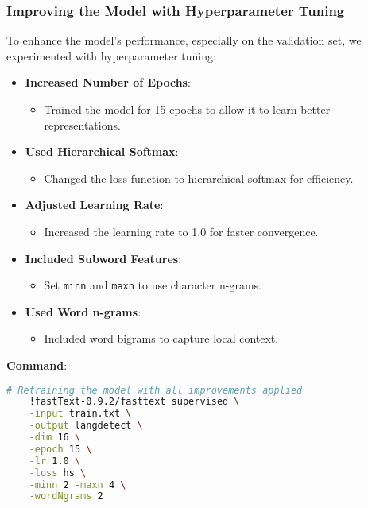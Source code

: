 \documentclass{beamer}
\begin{document}
\begin{frame}[fragile]
    \frametitle{Improving the Model with Hyperparameter Tuning}
    To enhance the model's performance, especially on the validation set, we experimented with hyperparameter tuning:
    \begin{itemize}
        \item \textbf{Increased Number of Epochs}:
        \begin{itemize}
            \item Trained the model for 15 epochs to allow it to learn better representations.
        \end{itemize}
        \item \textbf{Used Hierarchical Softmax}:
        \begin{itemize}
            \item Changed the loss function to hierarchical softmax for efficiency.
        \end{itemize}
        \item \textbf{Adjusted Learning Rate}:
        \begin{itemize}
            \item Increased the learning rate to 1.0 for faster convergence.
        \end{itemize}
        \item \textbf{Included Subword Features}:
        \begin{itemize}
            \item Set \texttt{minn} and \texttt{maxn} to use character n-grams.
        \end{itemize}
        \item \textbf{Used Word n-grams}:
        \begin{itemize}
            \item Included word bigrams to capture local context.
        \end{itemize}
    \end{itemize}
    \textbf{Command}:
    \begin{lstlisting}[language=bash]
    # Retraining the model with all improvements applied
    !fastText-0.9.2/fasttext supervised \
    -input train.txt \
    -output langdetect \
    -dim 16 \
    -epoch 15 \
    -lr 1.0 \
    -loss hs \
    -minn 2 -maxn 4 \
    -wordNgrams 2
    \end{lstlisting}
\end{frame}
\end{document}

